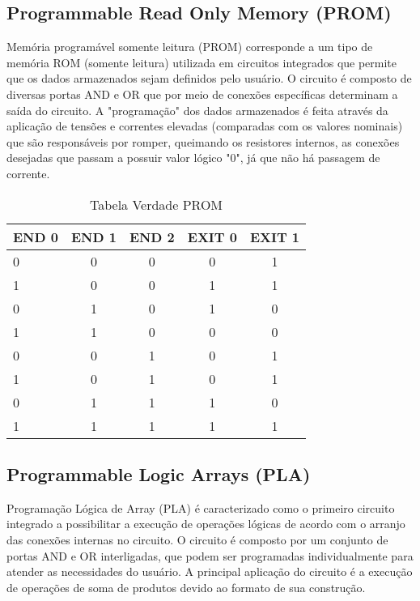 \subsection{\esp Programmable Read Only Memory (PROM)}
Memória programável somente leitura (PROM) corresponde a um tipo de memória ROM (somente leitura) utilizada em circuitos integrados que permite que os dados armazenados sejam definidos pelo usuário. O circuito é composto de diversas portas AND e OR que por meio de conexões específicas determinam a saída do circuito. A "programação" dos dados armazenados é feita através da aplicação de tensões e correntes elevadas (comparadas com os valores nominais) que são responsáveis por romper, queimando os resistores internos, as conexões desejadas que passam a possuir valor lógico "0", já que não há passagem de corrente.

\begin{table}[htb]
	\centering
	\caption{\hspace{0.1cm} Tabela Verdade PROM}
	\vspace{-0.3cm} 
	\label{tab:tabela1}
	\begin{tabular}{l|c|c|c|c}
  \hline
    \textbf{END 0}	& \textbf{END 1} & \textbf{END 2} & \textbf{EXIT 0} & \textbf{EXIT 1}\\
    \hline
     0 & 0 & 0 & 0 & 1\\
     1 & 0 & 0 & 1 & 1\\
     0 & 1 & 0 & 1 & 0\\
     1 & 1 & 0 & 0 & 0\\
     0 & 0 & 1 & 0 & 1\\
     1 & 0 & 1 & 0 & 1\\
     0 & 1 & 1 & 1 & 0\\
     1 & 1 & 1 & 1 & 1\\
     \hline
 \end{tabular}
 	\vspace{.1cm}  
	\small

\end{table}

\subsection{\esp Programmable Logic Arrays (PLA)}

Programação Lógica de Array (PLA) é caracterizado como o primeiro circuito integrado a possibilitar a execução de operações lógicas de acordo com o arranjo das conexões internas no circuito. O circuito é composto por um conjunto de portas AND e OR interligadas, que podem ser programadas individualmente para atender as necessidades do usuário. A principal aplicação do circuito é a execução de operações de soma de produtos devido ao formato de sua construção.

